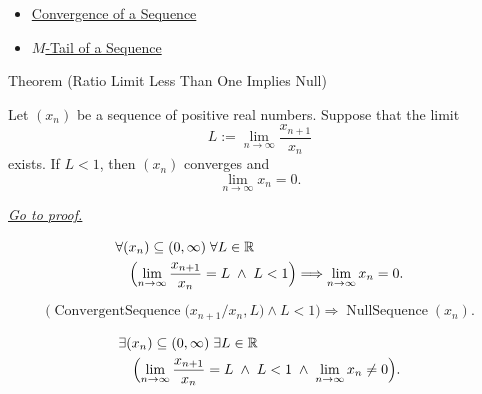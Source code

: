 \begin{dependencies}
\begin{itemize}
  \item \hyperref[def:convergent-sequence]{Convergence of a Sequence}
  \item \hyperref[def:m-tail]{$M$-Tail of a Sequence}
\end{itemize}
\end{dependencies}



\begin{theorembox}{Theorem (Ratio Limit Less Than One Implies Null)}
\begin{theorem}
\label{thm:ratio-limit-less-than-one-implies-null}

Let $(x_n)$ be a sequence of positive real numbers. Suppose that the
limit
\[
    L := \lim_{n\to\infty}\frac{x_{n+1}}{x_n}
\]
exists. If $L<1$, then $(x_n)$ converges and
\[
    \lim_{n\to\infty} x_n = 0.
\]

\smallskip
\noindent
\hyperref[prf:ratio-limit-less-than-one-implies-null]{\textit{Go to proof.}}
\end{theorem}
\end{theorembox}

\begin{remark*}
\[
\begin{aligned}
&\forall (x_n)\subseteq (0,\infty)\;\forall L\in\mathbb{R}\\
&\quad\Bigl(
    \lim_{n\to\infty}\frac{x_{n+1}}{x_n}=L
    \;\land\;
    L<1
\Bigr)
\Longrightarrow
\lim_{n\to\infty}x_n=0.
\end{aligned}
\]
\end{remark*}

\begin{remark*}
\[
\bigl(
\operatorname{ConvergentSequence}\bigl(x_{n+1}/x_n,L\bigr)
\land
L<1
\bigr)
\Longrightarrow
\operatorname{NullSequence}(x_n).
\]
\end{remark*}

\begin{remark*}
\[
\begin{aligned}
&\exists (x_n)\subseteq (0,\infty)\;\exists L\in\mathbb{R}\\
&\quad\Bigl(
    \lim_{n\to\infty}\frac{x_{n+1}}{x_n}=L
    \;\land\;
    L<1
    \;\land\;
    \lim_{n\to\infty}x_n\neq 0
\Bigr).
\end{aligned}
\]
\end{remark*}

